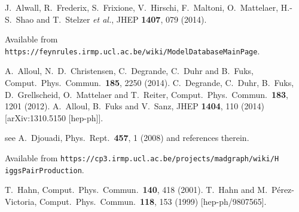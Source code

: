   J.~Alwall, R.~Frederix, S.~Frixione, V.~Hirschi, F.~Maltoni, O.~Mattelaer, H.-S.~Shao and T.~Stelzer {\it et al.},
  JHEP {\bf 1407}, 079 (2014).

 Available from \texttt{https://feynrules.irmp.ucl.ac.be/wiki/ModelDatabaseMainPage}.

  A.~Alloul, N.~D.~Christensen, C.~Degrande, C.~Duhr and B.~Fuks,
  Comput.\ Phys.\ Commun.\  {\bf 185}, 2250 (2014).
  C.~Degrande, C.~Duhr, B.~Fuks, D.~Grellscheid, O.~Mattelaer and T.~Reiter,
  Comput.\ Phys.\ Commun.\  {\bf 183}, 1201 (2012).
  A.~Alloul, B.~Fuks and V.~Sanz,
  JHEP {\bf 1404}, 110 (2014)
  [arXiv:1310.5150 [hep-ph]].
 
  see \eg  
  A.~Djouadi,
  Phys.\ Rept.\  {\bf 457}, 1 (2008) and references therein.
  
 Available from \texttt{https://cp3.irmp.ucl.ac.be/projects/madgraph/wiki/H
    iggsPairProduction}.

  T.~Hahn,
  Comput.\ Phys.\ Commun.\  {\bf 140}, 418 (2001).
  T.~Hahn and M.~P\'erez-Victoria,
  Comput.\ Phys.\ Commun.\  {\bf 118}, 153 (1999)
  [hep-ph/9807565].

